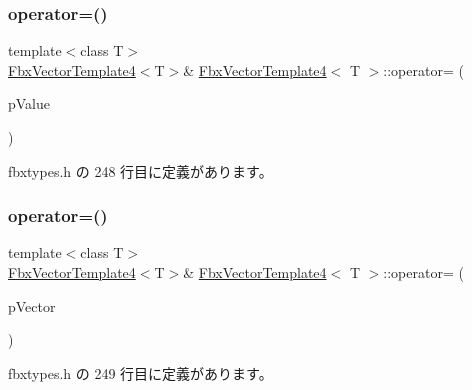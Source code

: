 \subsubsection{\texorpdfstring{operator=()}{operator=()}\hspace{0.1cm}{\footnotesize\ttfamily [2/3]}}
{\footnotesize\ttfamily template$<$class T$>$ \\
\hyperlink{class_fbx_vector_template4}{Fbx\+Vector\+Template4}$<$T$>$\& \hyperlink{class_fbx_vector_template4}{Fbx\+Vector\+Template4}$<$ T $>$\+::operator= (\begin{DoxyParamCaption}\item[{const \hyperlink{class_fbx_vector_template3}{Fbx\+Vector\+Template3}$<$ T $>$ \&}]{p\+Value }\end{DoxyParamCaption})\hspace{0.3cm}{\ttfamily [inline]}}



 fbxtypes.\+h の 248 行目に定義があります。

\mbox{\label{class_fbx_vector_template4_ac771b9e505496a28848da457b5fca667}} 
\subsubsection{\texorpdfstring{operator=()}{operator=()}\hspace{0.1cm}{\footnotesize\ttfamily [3/3]}}
{\footnotesize\ttfamily template$<$class T$>$ \\
\hyperlink{class_fbx_vector_template4}{Fbx\+Vector\+Template4}$<$T$>$\& \hyperlink{class_fbx_vector_template4}{Fbx\+Vector\+Template4}$<$ T $>$\+::operator= (\begin{DoxyParamCaption}\item[{const \hyperlink{class_fbx_vector_template4}{Fbx\+Vector\+Template4}$<$ T $>$ \&}]{p\+Vector }\end{DoxyParamCaption})\hspace{0.3cm}{\ttfamily [inline]}}



 fbxtypes.\+h の 249 行目に定義があります。

\mbox{\label{class_fbx_vector_template4_aeb4b2a1987cef4f774dd1d0c0c4f7ca5}} 
